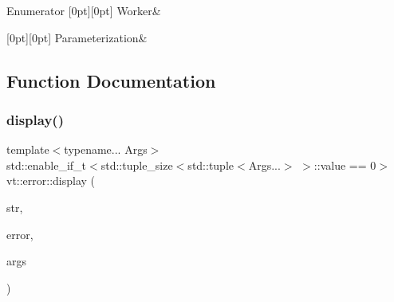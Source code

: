 \begin{DoxyEnumFields}{Enumerator}
[0pt][0pt]{}\mbox{\label{namespacevt_1_1error_a4ec28d13574cae1ad715adcf479d3f12a62efb9ec331e364b96efe68c8b03ca20}} 
Worker&\\
\hline

[0pt][0pt]{}\mbox{\label{namespacevt_1_1error_a4ec28d13574cae1ad715adcf479d3f12a8288407af7a0af8cffd175e6a8a6e992}} 
Parameterization&\\
\hline

\end{DoxyEnumFields}


\subsection{Function Documentation}
\mbox{\label{namespacevt_1_1error_a3079688a918c87c5ab5c638fad22ebcf}} 
\subsubsection{\texorpdfstring{display()}{display()}\hspace{0.1cm}{\footnotesize\ttfamily [1/3]}}
{\footnotesize\ttfamily template$<$typename... Args$>$ \\
std\+::enable\+\_\+if\+\_\+t$<$std\+::tuple\+\_\+size$<$std\+::tuple$<$Args...$>$ $>$\+::value == 0$>$ vt\+::error\+::display (\begin{DoxyParamCaption}\item[{std\+::string const \&}]{str,  }\item[{\hyperlink{namespacevt_a793764d753923abc3d32929870beb485}{Error\+Code\+Type}}]{error,  }\item[{Args \&\&...}]{args }\end{DoxyParamCaption})\hspace{0.3cm}{\ttfamily [inline]}}

\mbox{\label{namespacevt_1_1error_a37c5633fbfd11a19486f467819a330f5}} 
